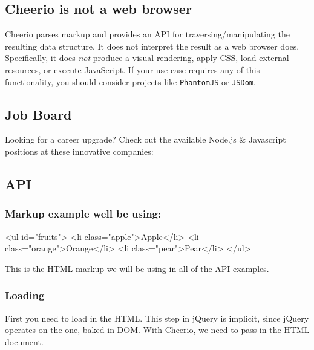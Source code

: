 \subsection*{Cheerio is not a web browser}

Cheerio parses markup and provides an A\+PI for traversing/manipulating the resulting data structure. It does not interpret the result as a web browser does. Specifically, it does {\itshape not} produce a visual rendering, apply C\+SS, load external resources, or execute Java\+Script. If your use case requires any of this functionality, you should consider projects like \href{http://phantomjs.org/}{\tt Phantom\+JS} or \href{https://github.com/tmpvar/jsdom}{\tt J\+S\+Dom}.

\subsection*{Job Board}

Looking for a career upgrade? Check out the available Node.\+js \& Javascript positions at these innovative companies\+:

\href{https://astro.netlify.com/automattic}{\tt } \href{https://astro.netlify.com/segment}{\tt } \href{https://astro.netlify.com/auth0}{\tt }

\subsection*{A\+PI}

\subsubsection*{Markup example we\textquotesingle{}ll be using\+:}


\begin{DoxyCode}
<ul id="fruits">
  <li class="apple">Apple</li>
  <li class="orange">Orange</li>
  <li class="pear">Pear</li>
</ul>
\end{DoxyCode}


This is the H\+T\+ML markup we will be using in all of the A\+PI examples.

\subsubsection*{Loading}

First you need to load in the H\+T\+ML. This step in j\+Query is implicit, since j\+Query operates on the one, baked-\/in D\+OM. With Cheerio, we need to pass in the H\+T\+ML document.

